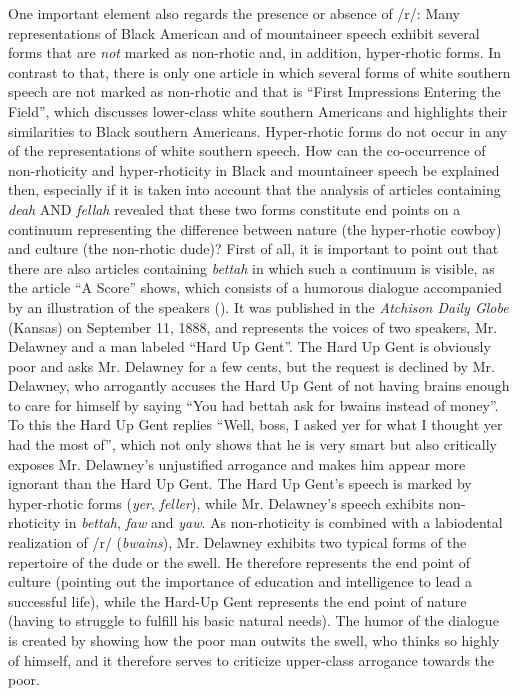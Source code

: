 One important element also regards the presence or absence of /r/: Many representations of Black American and of mountaineer speech exhibit several forms that are \emph{not} marked as non-rhotic and, in addition, hyper-rhotic forms. In contrast to that, there is only one article in which several forms of white southern speech are not marked as non-rhotic and that is “First Impressions Entering the Field”, which discusses lower-class white southern Americans and highlights their similarities to Black southern Americans. Hyper-rhotic forms do not occur in any of the representations of white southern speech. How can the co-occurrence of non-rhoticity and hyper-rhoticity in Black and mountaineer speech be explained then, especially if it is taken into account that the analysis of articles containing \emph{deah} AND \emph{fellah} revealed that these two forms constitute end points on a continuum representing the difference between nature (the hyper-rhotic cowboy) and culture (the non-rhotic dude)? First of all, it is important to point out that there are also articles containing \emph{bettah} in which such a continuum is visible, as the article “A Score” shows, which consists of a humorous dialogue accompanied by an illustration of the speakers (). It was published in the \emph{Atchison Daily Globe} (Kansas) on September 11, 1888, and represents the voices of two speakers, Mr. Delawney and a man labeled “Hard Up Gent”. The Hard Up Gent is obviously poor and asks Mr. Delawney for a few cents, but the request is declined by Mr. Delawney, who arrogantly accuses the Hard Up Gent of not having brains enough to care for himself by saying “You had bettah ask for bwains instead of money”. To this the Hard Up Gent replies “Well, boss, I asked yer for what I thought yer had the most of”, which not only shows that he is very smart but also critically exposes Mr. Delawney’s unjustified arrogance and makes him appear more ignorant than the Hard Up Gent. The Hard Up Gent’s speech is marked by hyper-rhotic forms (\emph{yer}, \emph{feller}), while Mr. Delawney’s speech exhibits non-rhoticity in \emph{bettah}, \emph{faw} and \emph{yaw}. As non-rhoticity is combined with a labiodental realization of /r/ (\emph{bwains}), Mr. Delawney exhibits two typical forms of the repertoire of the dude or the swell. He therefore represents the end point of culture (pointing out the importance of education and intelligence to lead a successful life), while the Hard-Up Gent represents the end point of nature (having to struggle to fulfill his basic natural needs). The humor of the dialogue is created by showing how the poor man outwits the swell, who thinks so highly of himself, and it therefore serves to criticize upper-class arrogance towards the poor.


